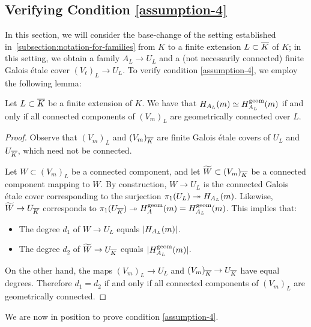 \subsection{Verifying Condition \ref{assumption-4}}\label{ver1}
In this section, we will consider the base-change of the setting established in~\ref{subsection:notation-for-families} from $K$ to a finite extension $L \subset \overline{K}$ of $K$; in this setting, we obtain a family $A_L \to U_L$ and a (not necessarily connected) finite Galois \'{e}tale cover $(V_\ell)_L \to U_L$. To verify condition \ref{assumption-4}, we employ the following lemma:

\begin{lemma}
	\label{lemma:geometrically-connected-components}
	Let $L \subset \overline{K}$ be a finite extension of $K$. We have that $H_{A_L}(m) \simeq H_{A_L}^{\operatorname{geom}}(m)$
	if and only if all connected components of $(V_m)_L$ are geometrically connected over $L$.
\end{lemma}
\begin{proof}
	Observe that $(V_m)_L$ and $(V_m)_{\overline{K}}$ are finite Galois \'etale covers of $U_L$ and $U_{\overline{K}}$, which need not be connected.

	Let $W \subset (V_m)_L$ be a connected component, and let $\widetilde{W} \subset (V_m)_{\overline{K}}$ be a connected component mapping to $W$. By construction, $W \to U_L$ is the connected Galois \'etale cover corresponding to the surjection $\pi_1(U_L) \twoheadrightarrow H_{A_L}(m)$. Likewise, $\widetilde{W} \to U_{\overline{K}}$ corresponds to $\pi_1(U_{\overline{K}}) \twoheadrightarrow H_{A}^{\operatorname{geom}}(m) = H_{A_L}^{\operatorname{geom}}(m)$. This implies that:
	\begin{itemize}
		\item The degree $d_1$ of $W \to U_L$ equals $|H_{A_L}(m)|$.
		\item The degree $d_2$ of $\widetilde{W} \to U_{\overline{K}}$ equals $|H_{A_L}^{\operatorname{geom}}(m)|$.
	\end{itemize}
	On the other hand, the maps $(V_m)_L \to U_L$ and $(V_m)_{\overline{K}} \to U_{\overline{K}}$ have equal degrees. Therefore $d_1 = d_2$ if and only if all connected components of $(V_m)_L$ are geometrically connected.
\end{proof}

We are now in position to prove condition \ref{assumption-4}.

